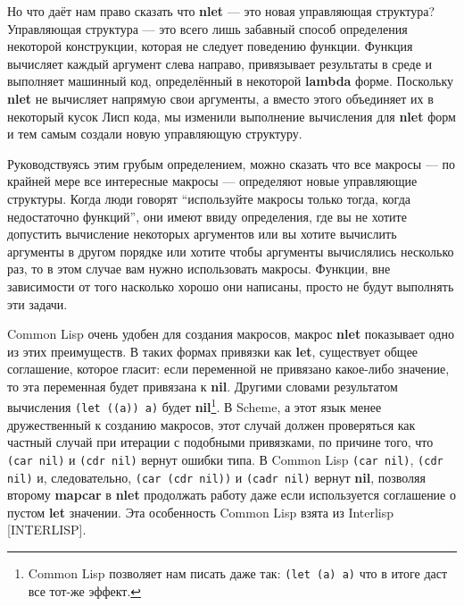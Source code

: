 Но что даёт нам право сказать что \textbf{nlet} --- это новая управляющая структура? Управляющая структура --- это всего лишь забавный способ определения некоторой конструкции, которая не следует поведению функции. Функция вычисляет каждый аргумент слева направо, привязывает результаты в среде и выполняет машинный код, определённый в некоторой \textbf{lambda} форме. Поскольку \textbf{nlet} не вычисляет напрямую свои аргументы, а вместо этого объединяет их в некоторый кусок Лисп кода, мы изменили выполнение вычисления для \textbf{nlet} форм и тем самым создали новую управляющую структуру.

Руководствуясь этим грубым определением, можно сказать что все макросы --- по крайней мере все интересные макросы --- определяют новые управляющие структуры. Когда люди говорят ``используйте макросы только тогда, когда недостаточно функций'', они имеют ввиду определения, где вы не хотите допустить вычисление некоторых аргументов или вы хотите вычислить аргументы в другом порядке или хотите чтобы аргументы вычислялись несколько раз, то в этом случае вам нужно использовать макросы. Функции, вне зависимости от того насколько хорошо они написаны, просто не будут выполнять эти задачи.

Common Lisp очень удобен для создания макросов, макрос \textbf{nlet} показывает одно из этих преимуществ. В таких формах привязки как \textbf{let}, существует общее соглашение, которое гласит: если переменной не привязано какое-либо значение, то эта переменная будет привязана к \textbf{nil}. Другими словами результатом вычисления \verb"(let ((a)) a)" будет \textbf{nil}\footnote{Common Lisp позволяет нам писать даже так: \verb"(let (a) a)" что в итоге даст все тот-же эффект.}. В Scheme, а этот язык менее дружественный к созданию макросов, этот случай должен проверяться как частный случай при итерации с подобными привязками, по причине того, что \verb"(car nil)" и \verb"(cdr nil)" вернут ошибки типа. В Common Lisp \verb"(car nil)", \verb"(cdr nil)" и, следовательно, \verb"(car (cdr nil))" и \verb"(cadr nil)" вернут \textbf{nil}, позволяя второму \textbf{mapcar} в \textbf{nlet} продолжать работу даже если используется соглашение о пустом \textbf{let} значении. Эта особенность Common Lisp взята из Interlisp [INTERLISP].

